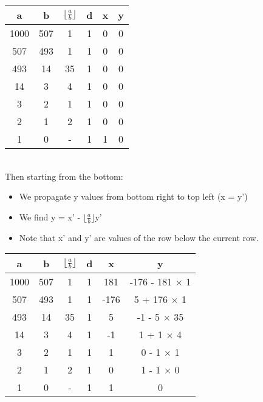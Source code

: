 \documentclass[11pt]{article}
\begin{document}
\begin{enumerate}
\begin{itemize}
            \begin{center}
            \begin{tabular}{| c | c | c | c | c | c |} 
            \hline
            a & b & ${\lfloor}\frac{a}{b}{\rfloor}$ & d & x & y \\
            \hline
            1000 & 507 & 1 & 1 & 0 & 0 \\
            507 & 493 & 1 & 1 & 0 & 0 \\
            493 & 14 & 35 & 1 & 0 & 0 \\
            14 & 3 & 4 & 1 & 0 & 0 \\
            3 & 2 & 1 & 1 & 0 & 0 \\
            2 & 1 & 2 & 1 & 0 & 0 \\
            1 & 0 & - & 1 & 1 & 0 \\
            \hline
            \end{tabular}
            \end{center}
            \\ Then starting from the bottom: \\
            \begin{itemize}
                \item We propagate y values from bottom right to top left (x = y')
                \item We find y = x' - ${\lfloor}\frac{a}{b}{\rfloor}$y'
                \item Note that x' and y' are values of the row below the current row.
            \end{itemize}
            \begin{center}
            \begin{tabular}{| c | c | c | c | c | c |} 
            \hline
            a & b & ${\lfloor}\frac{a}{b}{\rfloor}$ & d & x & y \\
            \hline
            1000 & 507 & 1 & 1 & 181 & -176 - 181 $\times$ 1 \\
            507 & 493 & 1 & 1 & -176 & 5 + 176 $\times$ 1 \\
            493 & 14 & 35 & 1 & 5 & -1 - 5 $\times$ 35 \\
            14 & 3 & 4 & 1 & -1 & 1 + 1 $\times$ 4 \\
            3 & 2 & 1 & 1 & 1 & 0 - 1 $\times$ 1 \\
            2 & 1 & 2 & 1 & 0 & 1 - 1 $\times$ 0 \\
            1 & 0 & - & 1 & 1 & 0 \\

\end{tabular}
\end{center}
\end{itemize}
\end{enumerate}
\end{document}
